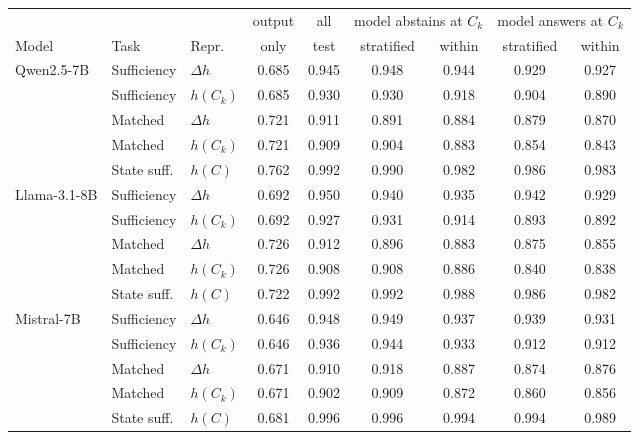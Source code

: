 \begin{tabular}{lllcccccc}
\toprule
& & & output & all & \multicolumn{2}{c}{model abstains at $C_k$} & \multicolumn{2}{c}{model answers at $C_k$} \\
\cmidrule(lr){6-7}\cmidrule(lr){8-9}
Model & Task & Repr. & only & test & stratified & within & stratified & within \\
\midrule
Qwen2.5-7B & Sufficiency & $\Delta h$ & 0.685 & 0.945 & 0.948 & 0.944 & 0.929 & 0.927 \\
 & Sufficiency & $h(C_k)$ & 0.685 & 0.930 & 0.930 & 0.918 & 0.904 & 0.890 \\
 & Matched & $\Delta h$ & 0.721 & 0.911 & 0.891 & 0.884 & 0.879 & 0.870 \\
 & Matched & $h(C_k)$ & 0.721 & 0.909 & 0.904 & 0.883 & 0.854 & 0.843 \\
 & State suff. & $h(C)$ & 0.762 & 0.992 & 0.990 & 0.982 & 0.986 & 0.983 \\
\midrule
Llama-3.1-8B & Sufficiency & $\Delta h$ & 0.692 & 0.950 & 0.940 & 0.935 & 0.942 & 0.929 \\
 & Sufficiency & $h(C_k)$ & 0.692 & 0.927 & 0.931 & 0.914 & 0.893 & 0.892 \\
 & Matched & $\Delta h$ & 0.726 & 0.912 & 0.896 & 0.883 & 0.875 & 0.855 \\
 & Matched & $h(C_k)$ & 0.726 & 0.908 & 0.908 & 0.886 & 0.840 & 0.838 \\
 & State suff. & $h(C)$ & 0.722 & 0.992 & 0.992 & 0.988 & 0.986 & 0.982 \\
\midrule
Mistral-7B & Sufficiency & $\Delta h$ & 0.646 & 0.948 & 0.949 & 0.937 & 0.939 & 0.931 \\
 & Sufficiency & $h(C_k)$ & 0.646 & 0.936 & 0.944 & 0.933 & 0.912 & 0.912 \\
 & Matched & $\Delta h$ & 0.671 & 0.910 & 0.918 & 0.887 & 0.874 & 0.876 \\
 & Matched & $h(C_k)$ & 0.671 & 0.902 & 0.909 & 0.872 & 0.860 & 0.856 \\
 & State suff. & $h(C)$ & 0.681 & 0.996 & 0.996 & 0.994 & 0.994 & 0.989 \\
\bottomrule
\end{tabular}